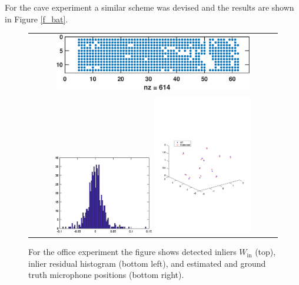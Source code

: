 \documentclass[
]{book}
\def\Win{W_{\text{in}}}
\begin{document}
For the cave experiment a similar scheme was devised and the results are shown in Figure \ref{f_bat}.

\begin{figure}
\begin{tabular}{c}
\includegraphics[width=0.8\textwidth]{original_papers/icassp_2018/figs/MH454_F_inl.eps} \\
\includegraphics[width=0.4\textwidth]{original_papers/icassp_2018/figs/MH454_F_res.eps} 
\includegraphics[width=0.4\textwidth]{original_papers/icassp_2018/figs/MH454_F_fig_new.pdf} 
\end{tabular}
\caption{For the office experiment the figure shows  detected inliers $\Win$ (top),  inlier residual histogram (bottom left), and  estimated and ground truth microphone positions (bottom right).}
\label{f_454H}
\end{figure}
\end{document}
